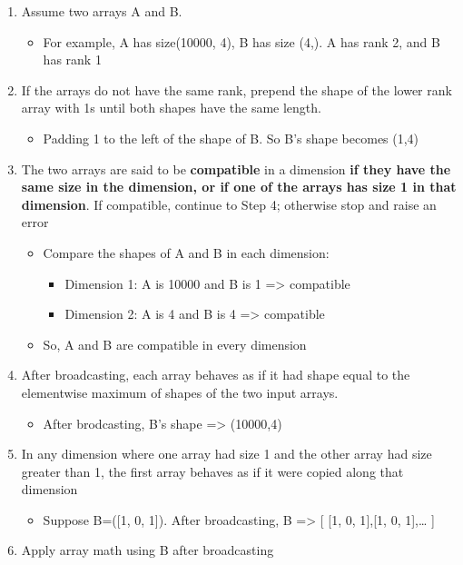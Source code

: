 \documentclass[11pt]{article}
\providecommand{\tightlist}{%
      \setlength{\itemsep}{0pt}\setlength{\parskip}{0pt}}
\begin{document}
\begin{enumerate}
\def\labelenumi{\arabic{enumi}.}
\item
  Assume two arrays A and B.

  \begin{itemize}
  \tightlist
  \item
    For example, A has size(10000, 4), B has size (4,). A has rank 2,
    and B has rank 1
  \end{itemize}
\item
  If the arrays do not have the same rank, prepend the shape of the
  lower rank array with 1s until both shapes have the same length.

  \begin{itemize}
  \tightlist
  \item
    Padding 1 to the left of the shape of B. So B's shape becomes (1,4)
  \end{itemize}
\item
  The two arrays are said to be \textbf{compatible} in a dimension
  \textbf{if they have the same size in the dimension, or if one of the
  arrays has size 1 in that dimension}. If compatible, continue to Step
  4; otherwise stop and raise an error

  \begin{itemize}
  \tightlist
  \item
    Compare the shapes of A and B in each dimension:

    \begin{itemize}
    \tightlist
    \item
      Dimension 1: A is 10000 and B is 1 =\textgreater{} compatible \\
    \item
       Dimension 2: A is 4 and B is 4 =\textgreater{} compatible
    \end{itemize}
  \item
     So, A and B are compatible in every dimension
  \end{itemize}
\item
  After broadcasting, each array behaves as if it had shape equal to the
  elementwise maximum of shapes of the two input arrays.

  \begin{itemize}
  \tightlist
  \item
     After brodcasting, B's shape =\textgreater{} (10000,4)
  \end{itemize}
\item
  In any dimension where one array had size 1 and the other array had
  size greater than 1, the first array behaves as if it were copied
  along that dimension

  \begin{itemize}
  \tightlist
  \item
     Suppose B=({[}1, 0, 1{]}). After broadcasting, B =\textgreater{}
    {[} {[}1, 0, 1{]},{[}1, 0, 1{]},\ldots{} {]}
  \end{itemize}
\item
  Apply array math using B after broadcasting
\end{enumerate}
\end{document}
